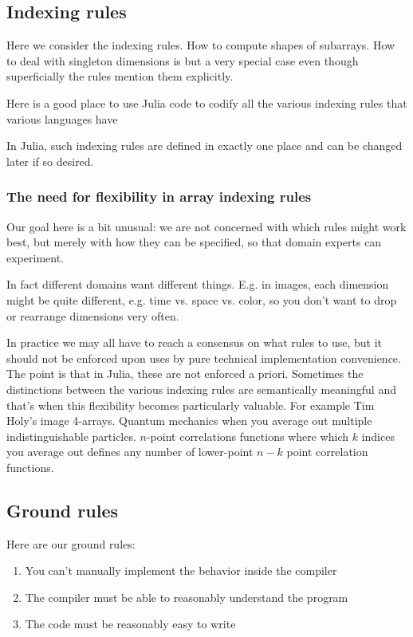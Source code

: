 \documentclass[preprint]{sigplanconf}
\begin{document}
\subsection{Indexing rules}

Here we consider the indexing rules. How to compute shapes of subarrays. How
to deal with singleton dimensions is but a very special case even though
superficially the rules mention them explicitly.

Here is a good place to use Julia code to codify all the various indexing
rules that various languages have

In Julia, such indexing rules are defined in exactly one place and can be
changed later if so desired.

\subsubsection{The need for flexibility in array indexing rules}

Our goal here is a bit unusual: we are not concerned with which rules might
work best, but merely with how they can be specified, so that domain experts
can experiment.

In fact different domains want different things. E.g. in images, each
dimension might be quite different, e.g. time vs. space vs. color, so you
don't want to drop or rearrange dimensions very often.

In practice we may all have to reach a consensus on what rules to use, but it
should not be enforced upon uses by pure technical implementation convenience.
The point is that in Julia, these are not enforced a priori. Sometimes the
distinctions between the various indexing rules are semantically meaningful
and that's when this flexibility becomes particularly valuable. For example
Tim Holy's image 4-arrays. Quantum mechanics when you average out multiple
indistinguishable particles. $n$-point correlations functions where which $k$
indices you average out defines any number of lower-point $n-k$ point
correlation functions.

\subsection{Ground rules}
Here are our ground rules:

\begin{enumerate}
\item You can't manually implement the behavior inside the compiler
\item The compiler must be able to reasonably understand the program
\item The code must be reasonably easy to write
\end{enumerate}
\end{document}
